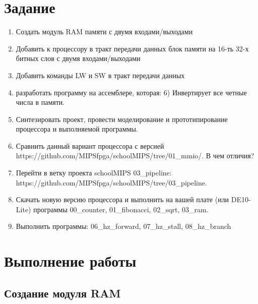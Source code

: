 \documentclass[a4paper,14pt]{article}
\begin{document}
	
	\tableofcontents
	\pagebreak
	\section{Задание}
	
	\begin{enumerate}
		\item Создать модуль RAM памяти с двумя входами/выходами

		\item Добавить к процессору в тракт передачи данных блок памяти на 16-ть 32-х битных слов с двумя входами/выходами
		
		\item Добавить команды LW и SW в тракт передачи данных

		\item разработать программу на ассемблере, которая: 6) Инвертирует все четные числа в памяти.
		
		\item Синтезировать проект, провести моделирование и прототипирование процессора и выполняемой программы. 
		
		\item Сравнить данный вариант процессора с версией https://github.com/MIPSfpga/schoolMIPS/tree/01\_mmio/. В чем отличия?

		\item Перейти в ветку проекта schoolMIPS 03\_pipeline: https://github.com/MIPSfpga/schoolMIPS/tree/03\_pipeline.
		
		\item Скачать новую версию процессора и выполнить на вашей плате (или DE10-Lite) программы 00\_counter, 01\_fibonacci, 02\_sqrt, 03\_ram.
		
		\item Выполнить программы: 06\_hz\_forward, 07\_hz\_stall, 08\_hz\_branch
	\end{enumerate}

	
	\section{Выполнение работы}
	
	
	\subsection{Создание модуля RAM}
\end{document}
